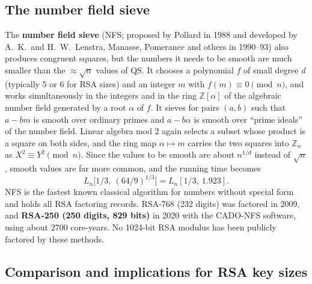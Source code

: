 \subsection{The number field sieve \new}

The \textbf{number field sieve} (NFS; proposed by Pollard in 1988 and developed by A.\ K.\ and H.\ W.\ Lenstra, Manasse, Pomerance and others in 1990--93) also produces congruent squares, but the numbers it needs to be smooth are much smaller than the $\approx\sqrt n$ values of QS. It chooses a polynomial $f$ of small degree $d$ (typically 5 or 6 for RSA sizes) and an integer $m$ with $f(m) \equiv 0 \pmod n$, and works simultaneously in the integers and in the ring $\mathbb{Z}[\alpha]$ of the algebraic number field generated by a root $\alpha$ of $f$. It sieves for pairs $(a, b)$ such that $a - bm$ is smooth over ordinary primes and $a - b\alpha$ is smooth over ``prime ideals'' of the number field. Linear algebra mod 2 again selects a subset whose product is a square on both sides, and the ring map $\alpha \mapsto m$ carries the two squares into $\mathbb{Z}_n$ as $X^2 \equiv Y^2 \pmod n$. Since the values to be smooth are about $n^{1/d}$ instead of $\sqrt n$, smooth values are far more common, and the running time becomes
\[
L_n\big[1/3,\ (64/9)^{1/3}\big] = L_n[1/3,\ 1.923].
\]
NFS is the fastest known classical algorithm for numbers without special form and holds all RSA factoring records. RSA-768 (232 digits) was factored in 2009, and \textbf{RSA-250 (250 digits, 829 bits)} in 2020 with the CADO-NFS software, using about 2700 core-years. No 1024-bit RSA modulus has been publicly factored by these methods.

\subsection{Comparison and implications for RSA key sizes \new}

